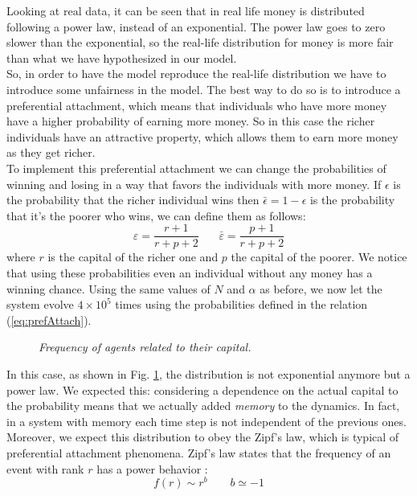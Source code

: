 Looking at real data, it can be seen that in real life money is distributed following a power law, instead of an exponential.
The power law goes to zero slower than the exponential, so the real-life distribution for money is more fair than what we have hypothesized in our model. \\
So, in order to have the model reproduce the real-life distribution we have to introduce some unfairness in the model.
The best way to do so is to introduce a preferential attachment, which means that individuals who have more money have a higher probability of earning more money.
So in this case the richer individuals have an attractive property, which allows them to earn more money as they get richer. \\
To implement this preferential attachment we can change the probabilities of winning and losing in a way that favors the individuals with more money.
If $\epsilon$ is the probability that the richer individual wins then $\bar{\epsilon} = 1 - \epsilon$ is the probability that it's the poorer who wins, we can define them as follows:
\begin{equation}
	\varepsilon = \frac{r + 1}{r + p + 2} \ \ \ \ \ \ \ \  \bar{\varepsilon} = \frac{p + 1}{r + p + 2}
	\label{eq:prefAttach}
\end{equation}
where $r$ is the capital of the richer one and $p$ the capital of the poorer.
We notice that using these probabilities even an individual without any money has a winning chance.
Using the same values of $N$ and $\alpha$ as before, we now let the system evolve $4 \times 10^5$ times using the probabilities defined in the relation (\ref{eq:prefAttach}).
\begin{figure}[ht!]
    \centering
    \scalebox{.7}{}
    \caption{\emph{Frequency of agents related to their capital.}}
    \label{fig:prefAttach}
\end{figure}
In this case, as shown in Fig. \ref{fig:prefAttach}, the distribution is not exponential anymore but a power law.
We expected this: considering a dependence on the actual capital to the probability means that we actually added \emph{memory} to the dynamics.
In fact, in a system with memory each time step is not independent of the previous ones.
\\Moreover, we expect this distribution to obey the Zipf's law, which is typical of preferential attachment phenomena.
Zipf's law states that the frequency of an event with rank $r$ has a power behavior \cite{zipf}:
\begin{equation}
    f(r) \sim r^b \ \ \ \ \ \ \ \ \ b \simeq -1
    \label{eq:zipf}
\end{equation}
